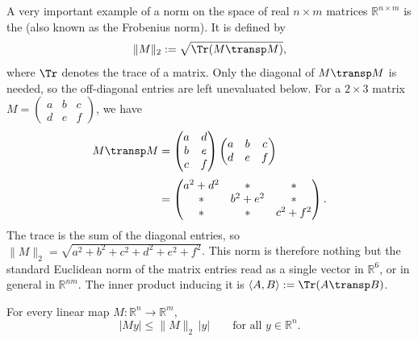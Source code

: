 \begin{example}
\label{ex:hilbert_schmidt_norm}
A very important example of a norm on the space of real $n \times m$ matrices
$\mathbb{R}^{n \times m}$ is the  (also known as the Frobenius
norm). It is defined by
\[
\|M\|_2 := \sqrt{\Tr(M\transp M)},
\]
where $\Tr$ denotes the trace of a matrix. Only the diagonal of $M\transp M$ is needed, so the
off-diagonal entries are left unevaluated below. For a $2 \times 3$ matrix
$M = \left(\begin{smallmatrix} a & b & c \\ d & e & f \end{smallmatrix}\right)$, we have
\begin{align*}
M\transp M
  &= \begin{pmatrix} a & d \\ b & e \\ c & f \end{pmatrix}
     \begin{pmatrix} a & b & c \\ d & e & f \end{pmatrix} \\[0.6ex]
  &= \begin{pmatrix} a^2+d^2 & * & * \\ * & b^2+e^2 & * \\ * & * & c^2+f^2 \end{pmatrix}.
\end{align*}
The trace is the sum of the diagonal entries, so $\|M\|_2 = \sqrt{a^2+b^2+c^2+d^2+e^2+f^2}$. This
norm is therefore nothing but the standard Euclidean norm of the matrix entries read as a single
vector in $\mathbb{R}^{6}$, or in general in $\mathbb{R}^{nm}$. The inner product inducing it is
$\langle A, B \rangle := \Tr(A\transp B)$.
\end{example}

\begin{lemma}
\label{lem:hilbert_schmidt_bounds_lengths}
For every linear map $M : \mathbb{R}^n \to \mathbb{R}^m$,
\[|My| \leq \|M\|_2\,|y| \qquad \text{for all } y \in \mathbb{R}^n.\]
\end{lemma}

